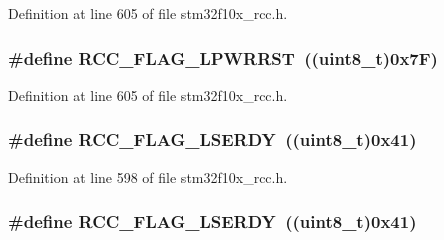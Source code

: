 Definition at line 605 of file stm32f10x\+\_\+rcc.\+h.

\subsubsection[{\texorpdfstring{R\+C\+C\+\_\+\+F\+L\+A\+G\+\_\+\+L\+P\+W\+R\+R\+ST}{RCC_FLAG_LPWRRST}}]{\setlength{\rightskip}{0pt plus 5cm}\#define R\+C\+C\+\_\+\+F\+L\+A\+G\+\_\+\+L\+P\+W\+R\+R\+ST~(({\bf uint8\+\_\+t})0x7\+F)}\hypertarget{group___r_c_c___flag_ga67049531354aed7546971163d02c9920}{}\label{group___r_c_c___flag_ga67049531354aed7546971163d02c9920}


Definition at line 605 of file stm32f10x\+\_\+rcc.\+h.

\subsubsection[{\texorpdfstring{R\+C\+C\+\_\+\+F\+L\+A\+G\+\_\+\+L\+S\+E\+R\+DY}{RCC_FLAG_LSERDY}}]{\setlength{\rightskip}{0pt plus 5cm}\#define R\+C\+C\+\_\+\+F\+L\+A\+G\+\_\+\+L\+S\+E\+R\+DY~(({\bf uint8\+\_\+t})0x41)}\hypertarget{group___r_c_c___flag_gac9fb963db446c16e46a18908f7fe1927}{}\label{group___r_c_c___flag_gac9fb963db446c16e46a18908f7fe1927}


Definition at line 598 of file stm32f10x\+\_\+rcc.\+h.

\subsubsection[{\texorpdfstring{R\+C\+C\+\_\+\+F\+L\+A\+G\+\_\+\+L\+S\+E\+R\+DY}{RCC_FLAG_LSERDY}}]{\setlength{\rightskip}{0pt plus 5cm}\#define R\+C\+C\+\_\+\+F\+L\+A\+G\+\_\+\+L\+S\+E\+R\+DY~(({\bf uint8\+\_\+t})0x41)}\hypertarget{group___r_c_c___flag_gac9fb963db446c16e46a18908f7fe1927}{}\label{group___r_c_c___flag_gac9fb963db446c16e46a18908f7fe1927}


